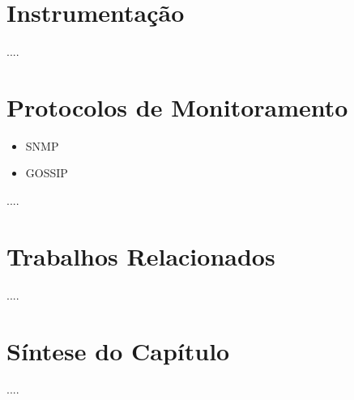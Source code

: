\section{Instrumentação}

....


\section{Protocolos de Monitoramento}
\begin{itemize}
\item SNMP
\item GOSSIP
\end{itemize}
....


\section{Trabalhos Relacionados}

....


\section{Síntese do Capítulo}

....


